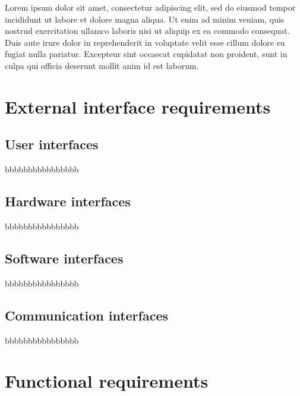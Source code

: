 Lorem ipsum dolor sit amet, consectetur adipiscing elit, sed do eiusmod tempor incididunt ut labore et dolore magna aliqua. Ut enim ad minim veniam, quis nostrud exercitation ullamco laboris nisi ut aliquip ex ea commodo consequat. Duis aute irure dolor in reprehenderit in voluptate velit esse cillum dolore eu fugiat nulla pariatur. Excepteur sint occaecat cupidatat non proident, sunt in culpa qui officia deserunt mollit anim id est laborum.

\newpage

\section{External interface requirements}
\label{sec:external_interface_requirements}%

\subsection{User interfaces}
\label{subsec:user_interfaces}%
bbbbbbbbbbbbbbbb

\subsection{Hardware interfaces}
\label{subsec:hardware_interfaces}%
bbbbbbbbbbbbbbbb

\subsection{Software interfaces}
\label{subsec:software_interfaces}%
bbbbbbbbbbbbbbbb

\subsection{Communication interfaces}
\label{subsec:communication_interfaces}%
bbbbbbbbbbbbbbbb

\section{Functional requirements}
\label{sec:functional_requirements}%


